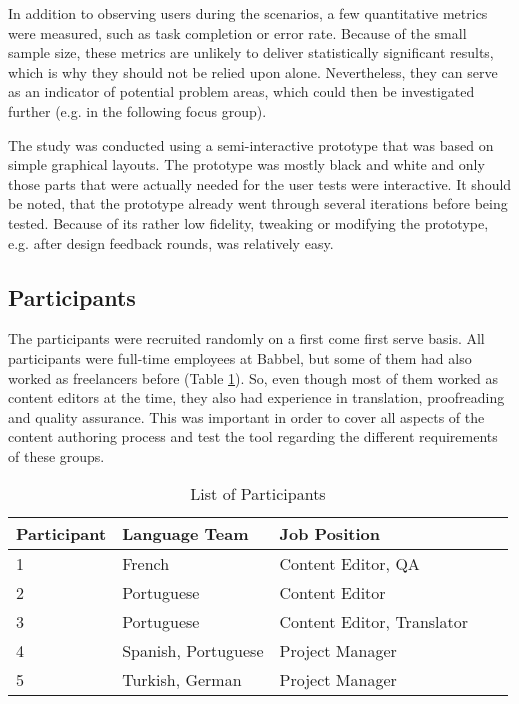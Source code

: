 In addition to observing users during the scenarios, a few quantitative metrics were measured, such as task completion or error rate. Because of the small sample size, these metrics are unlikely to deliver statistically significant results, which is why they should not be relied upon alone. Nevertheless, they can serve as an indicator of potential problem areas, which could then be investigated further (e.g. in the following focus group).

The study was conducted using a semi-interactive prototype that was based on simple graphical layouts. The prototype was mostly black and white and only those parts that were actually needed for the user tests were interactive. It should be noted, that the prototype already went through several iterations before being tested. Because of its rather low fidelity, tweaking or modifying the prototype, e.g. after design feedback rounds, was relatively easy.

\subsection{Participants}
The participants were recruited randomly on a first come first serve basis. All participants were full-time employees at Babbel, but some of them had also worked as freelancers before (Table \ref{table:user-test-participants}). So, even though most of them worked as content editors at the time, they also had experience in translation, proofreading and quality assurance. This was important in order to cover all aspects of the content authoring process and test the tool regarding the different requirements of these groups.

\begin{table}[h!]
\begin{tabular}{|l|l|l|p{2cm}|p{4cm}|}
\hline
\rowcolor[HTML]{EFEFEF}
{\bf Participant} & {\bf Language Team} & {\bf Job Position} \\ \hline
1 & French & Content Editor, QA \\ \hline
2 & Portuguese & Content Editor \\ \hline
3 & Portuguese & Content Editor, Translator \\ \hline
4 & Spanish, Portuguese & Project Manager \\ \hline
5 & Turkish, German & Project Manager \\ \hline
\end{tabular}
\centering
\caption{List of Participants}
\label{table:user-test-participants}
\end{table}


